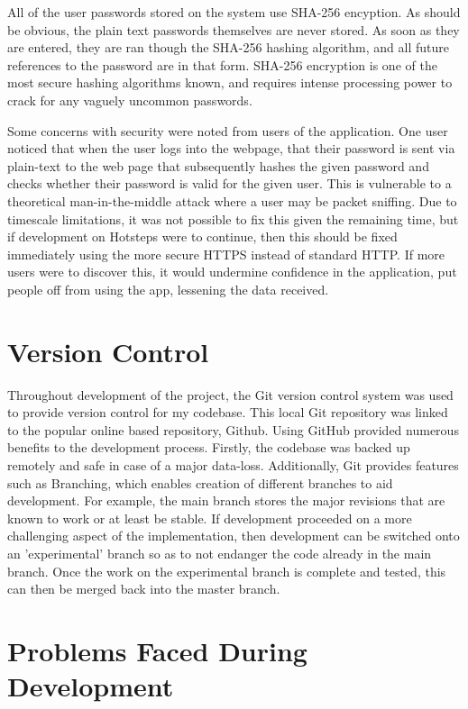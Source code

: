 \documentclass{l4proj}
\begin{document}
All of the user passwords stored on the system use SHA-256 encyption. As should be obvious, the plain text passwords themselves are never stored. As soon as they are entered, they are ran though the SHA-256 hashing algorithm, and all future references to the password are in that form. SHA-256 encryption is one of the most secure hashing algorithms known, and requires intense processing power to crack for any vaguely uncommon passwords.

Some concerns with security were noted from users of the application. One user noticed that when the user logs into the webpage, that their password is sent via plain-text to the web page that subsequently hashes the given password and checks whether their password is valid for the given user. This is vulnerable to a theoretical man-in-the-middle attack where a user may be packet sniffing. Due to timescale limitations, it was not possible to fix this given the remaining time, but if development on Hotsteps were to continue, then this should be fixed immediately using the more secure HTTPS instead of standard HTTP. If more users were to discover this, it would undermine confidence in the application, put people off from using the app, lessening the data received.

\section{Version Control}

Throughout development of the project, the Git version control system was used to provide version control for my codebase. This local Git repository was linked to the popular online based repository, Github.  Using GitHub provided numerous benefits to the development process. Firstly, the codebase was backed up remotely and safe in case of a major data-loss. Additionally, Git provides features such as Branching, which enables creation of different branches to aid development. For example, the main branch stores the major revisions that are known to work or at least be stable. If development proceeded on a more challenging aspect of the implementation, then development can be switched onto an 'experimental' branch so as to not endanger the code already in the main branch. Once the work on the experimental branch is complete and tested, this can then be merged back into the master branch.

\section{Problems Faced During Development}
\end{document}
